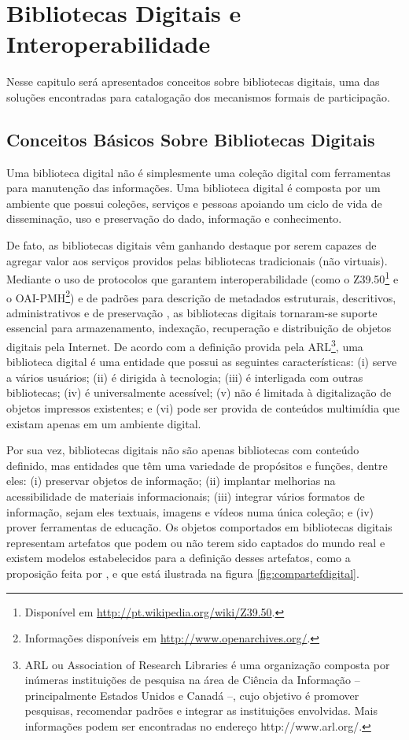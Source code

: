 \chapter{Bibliotecas Digitais e Interoperabilidade}
\label{cap:bibinterop}
Nesse capitulo será apresentados conceitos sobre bibliotecas digitais, uma das soluções encontradas para catalogação dos mecanismos formais de participação.

\section{Conceitos Básicos Sobre Bibliotecas Digitais}

Uma biblioteca digital não é simplesmente uma coleção digital com ferramentas para manutenção das informações. Uma biblioteca digital é composta por um ambiente que possui coleções, serviços e pessoas apoiando um ciclo de vida de disseminação, uso e preservação do dado, informação e conhecimento.

De fato, as bibliotecas digitais vêm ganhando destaque por serem capazes de agregar valor aos serviços providos pelas bibliotecas tradicionais (não virtuais). Mediante o uso de protocolos que garantem interoperabilidade (como o Z39.50\footnote{Disponível em \url{http://pt.wikipedia.org/wiki/Z39.50}.} e o OAI-PMH\footnote{Informações disponíveis em \url{http://www.openarchives.org/}.}) e de padrões para descrição de metadados estruturais, descritivos, administrativos e de preservação \cite{rodrigrues2003preservacao}, as bibliotecas digitais tornaram-se suporte essencial para armazenamento, indexação, recuperação e distribuição de objetos digitais pela Internet. De acordo com a definição provida pela ARL\footnote{ARL ou Association of Research Libraries é uma organização composta por inúmeras instituições de pesquisa na área de Ciência da Informação – principalmente Estados Unidos e Canadá –, cujo objetivo é promover pesquisas, recomendar padrões e integrar as instituições envolvidas. Mais informações podem ser encontradas no endereço http://www.arl.org/.}, uma biblioteca digital é uma entidade que possui as seguintes características: (i) serve a vários usuários; (ii) é dirigida à tecnologia; (iii) é interligada com outras bibliotecas; (iv) é universalmente acessível; (v) não é limitada à digitalização de objetos impressos existentes; e (vi) pode ser provida de conteúdos multimídia que existam apenas em um ambiente digital.

Por sua vez, bibliotecas digitais não são apenas bibliotecas com conteúdo definido, mas entidades que têm uma variedade de propósitos e funções, dentre eles: (i) preservar objetos de informação; (ii) implantar melhorias na acessibilidade de materiais informacionais; (iii) integrar vários formatos de informação, sejam eles textuais, imagens e vídeos numa única coleção; e (iv) prover ferramentas de educação. 
Os objetos comportados em bibliotecas digitais representam artefatos que podem ou não terem sido captados do mundo real e existem modelos estabelecidos para a definição desses artefatos, como a proposição feita por \cite{kuramoto2007bibliotecas}, e que está ilustrada na figura \ref{fig:compartefdigital}.

